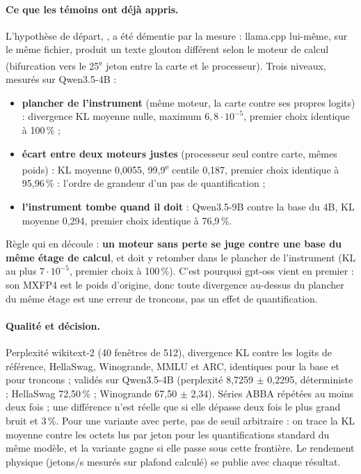 \paragraph{Ce que les témoins ont déjà appris.} L'hypothèse de départ, , a été démentie par la mesure : llama.cpp lui-même, sur le même fichier, produit un texte glouton différent selon le moteur de calcul (bifurcation vers le 25\textsuperscript{e} jeton entre la carte et le processeur). Trois niveaux, mesurés sur Qwen3.5-4B :
\begin{itemize}
\item \textbf{plancher de l'instrument} (même moteur, la carte contre ses propres logits) : divergence KL moyenne nulle, maximum $6{,}8\cdot10^{-5}$, premier choix identique à 100\,\% ;
\item \textbf{écart entre deux moteurs justes} (processeur seul contre carte, mêmes poids) : KL moyenne 0,0055, 99,9\textsuperscript{e} centile 0,187, premier choix identique à 95,96\,\% : l'ordre de grandeur d'un pas de quantification ;
\item \textbf{l'instrument tombe quand il doit} : Qwen3.5-9B contre la base du 4B, KL moyenne 0,294, premier choix identique à 76,9\,\%.
\end{itemize}
Règle qui en découle : \textbf{un moteur sans perte se juge contre une base du même étage de calcul}, et doit y retomber dans le plancher de l'instrument (KL au plus $7\cdot10^{-5}$, premier choix à 100\,\%). C'est pourquoi gpt-oss vient en premier : son MXFP4 est le poids d'origine, donc toute divergence au-dessus du plancher du même étage est une erreur de troncons, pas un effet de quantification.

\paragraph{Qualité et décision.} Perplexité wikitext-2 (40 fenêtres de 512), divergence KL contre les logits de référence, HellaSwag, Winogrande, MMLU et ARC, identiques pour la base et pour troncons ; validés sur Qwen3.5-4B (perplexité 8,7259 $\pm$ 0,2295, déterministe ; HellaSwag 72,50\,\% ; Winogrande 67,50 $\pm$ 2,34). Séries ABBA répétées au moins deux fois ; une différence n'est réelle que si elle dépasse deux fois le plus grand bruit et 3\,\%. Pour une variante avec perte, pas de seuil arbitraire : on trace la KL moyenne contre les octets lus par jeton pour les quantifications standard du même modèle, et la variante gagne si elle passe sous cette frontière. Le rendement physique (jetons/s mesurés sur plafond calculé) se publie avec chaque résultat.


